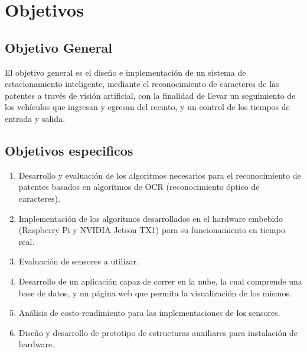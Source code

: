 \section{Objetivos}

\subsection*{Objetivo General}

El objetivo general es el diseño e implementación de un sistema de estacionamiento inteligente, mediante el reconocimiento de caracteres de las patentes a través de visión artificial, con la finalidad de llevar un seguimiento de los vehículos que ingresan y egresan del recinto, y un control de los tiempos de entrada y salida.

\subsection*{Objetivos especificos}

\begin{enumerate}
    \item Desarrollo y evaluación de los algoritmos necesarios para el reconocimiento de patentes basados en algoritmos de OCR (reconocimiento óptico de caracteres).
    \item Implementación de los algoritmos desarrollados en el hardware embebido (Raspberry Pi y NVIDIA Jetson TX1) para su funcionamiento en tiempo real.
    \item Evaluación de sensores a utilizar.
    \item Desarrollo de un aplicación capaz de correr en la nube, la cual comprende una base de datos, y un página web que permita la visualización de los mismos.
    \item Análisis de costo-rendimiento para las implementaciones de los sensores.
    \item Diseño y desarrollo de prototipo de estructuras auxiliares para instalación de hardware.
\end{enumerate}







